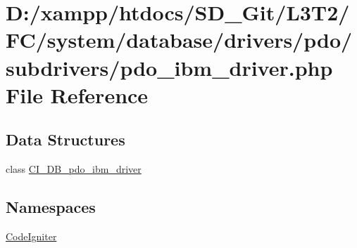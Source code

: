 \hypertarget{pdo__ibm__driver_8php}{}\section{D\+:/xampp/htdocs/\+S\+D\+\_\+\+Git/\+L3\+T2/\+F\+C/system/database/drivers/pdo/subdrivers/pdo\+\_\+ibm\+\_\+driver.php File Reference}
\label{pdo__ibm__driver_8php}
\subsection*{Data Structures}
\begin{DoxyCompactItemize}
\item 
class \hyperlink{class_c_i___d_b__pdo__ibm__driver}{C\+I\+\_\+\+D\+B\+\_\+pdo\+\_\+ibm\+\_\+driver}
\end{DoxyCompactItemize}
\subsection*{Namespaces}
\begin{DoxyCompactItemize}
\item 
 \hyperlink{namespace_code_igniter}{Code\+Igniter}
\end{DoxyCompactItemize}
